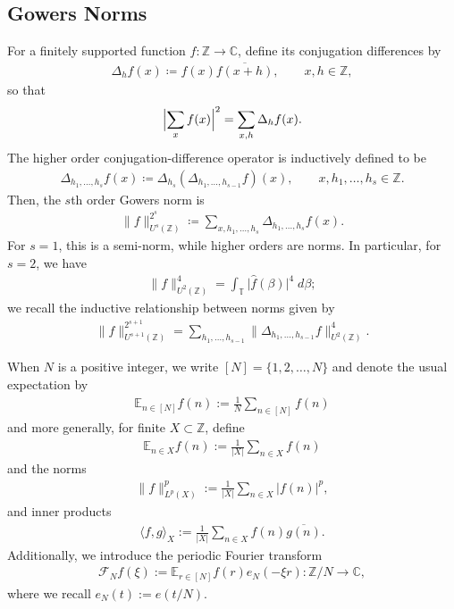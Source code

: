 \documentclass[12pt,leqno]{amsart}
\numberwithin{equation}{section}
\theoremstyle{definition}
\theoremstyle{plain}
\begin{document}
	
	\subsection{Gowers Norms}
	\label{sub:gowers_norms}
	For a finitely supported function $f\colon\mathbb Z\to\mathbb C$, define its conjugation differences by 
	\begin{align}\label{e:triangle}
		\Delta_h f(x) \coloneqq  f(x) \overline{f(x+h)}, 
		\qquad x,h\in \mathbb{Z}, 
	\end{align}
	so that 
	\begin{align} \label{e;double}
		\Bigl\lvert \sum_x f(x)\Bigr\rvert ^2 
		= 
		\sum_{x,h} \Delta_h f(x). 
	\end{align}
	The higher order conjugation-difference operator is inductively defined to be 
	\begin{align}
		\Delta_{h_1,\dots,h_s}f(x) \coloneqq  \Delta_{h_s}(\Delta_{h_1,\dots,h_{s-1}} f)(x), 
		\qquad x,h_1, \ldots, h_s\in \mathbb{Z} . 
	\end{align}
	Then, the $s$th order Gowers norm is 
	\begin{align} \label{e;GowersDef}
		\| f \|_{U^s(\mathbb{Z})}^{2^s} \coloneqq  
		\sum_{x,h_1,\dots,h_s} \Delta_{h_1,\dots,h_s}f(x). 
	\end{align}
	For $s=1$, this is a semi-norm, while higher orders are norms. In particular, for $s=2$, we have 
	\begin{align}  \label{e;U2-ell4}
		\lVert f \rVert_{U^2(\mathbb{Z} )} ^{4} 
		= \int_{\mathbb{T} } \lvert  \widehat{f} (\beta )\rvert ^{4}\;d \beta;
	\end{align}  
	we recall the inductive relationship between norms given by 
	\begin{align}\label{e:foliate}
		\| f \|_{U^{s+1}(\mathbb{Z})}^{2^{s+1}} = \sum_{h_1,\dots,h_{s-1}} \| \Delta_{h_1,\dots,h_{s-1}} f \|_{U^2(\mathbb{Z})}^4.
	\end{align}
	
	
	
	
	When $N$ is a positive integer, we write $[N]=\{1,2,\dots,N\}$ and denote the usual expectation by 
	\begin{align}
		\mathbb{E}_{n \in [N]} f(n) := \frac{1}{N} \sum_{n \in [N]} f(n)\end{align}
	and more generally, for finite $X \subset \mathbb{Z}$, define
	\begin{align}
		\mathbb{E}_{n \in X} f(n) := \frac{1}{|X|} \sum_{n \in X} f(n) \end{align}
	and the norms
	\begin{align}
		\| f \|_{L^p(X)}^p := \frac{1}{|X|} \sum_{n \in X} |f(n)|^p,
	\end{align}
	and inner products
	\begin{align}\label{e:Innerprod}
		\langle f,g \rangle_X := \frac{1}{|X|} \sum_{n \in X} f(n) \overline{g(n)}.
	\end{align}
	Additionally,  we introduce the periodic Fourier transform
	\begin{align}
		\mathcal{F}_N f(\xi) := \mathbb{E}_{r \in [N]} f(r) e_N(-\xi r) : \mathbb{Z}/N \to \mathbb{C},
	\end{align}
	where we recall $e_N(t) := e(t/N)$.
	
\end{document}
